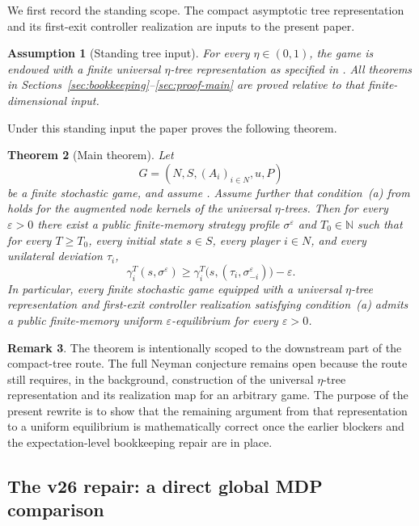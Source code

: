 \documentclass[12pt]{article}
\newtheorem{theorem}{Theorem}[section]
\newtheorem{assumption}[theorem]{Assumption}
\theoremstyle{definition}
\newtheorem{remark}[theorem]{Remark}
\newcommand{\eps}{\varepsilon}
\newcommand{\N}{\mathbb{N}}
\newcommand{\1}{\mathbf{1}}
\begin{document}
We first record the standing scope. The compact asymptotic tree representation and
its first-exit controller realization are inputs to the present paper.

\begin{assumption}[Standing tree input]
\label{ass:tree-input}
For every $\eta\in(0,1)$, the game is endowed with a finite universal
$\eta$-tree representation as specified in
. All theorems in
Sections~\ref{sec:bookkeeping}--\ref{sec:proof-main} are proved relative to that
finite-dimensional input.
\end{assumption}

Under this standing input the paper proves the following theorem.

\begin{theorem}[Main theorem]
\label{thm:main}
Let
\[
G=(N,S,(A_i)_{i\in N},u,P)
\]
be a finite stochastic game, and assume . Assume further
that condition~\textnormal{(a)} from  holds for the augmented node
kernels of the universal $\eta$-trees. Then for every $\eps>0$ there exist a
public finite-memory strategy profile $\sigma^\eps$ and $T_0\in\N$ such that for
every $T\ge T_0$, every initial state $s\in S$, every player $i\in N$, and every
unilateral deviation $\tau_i$,
\[
\gamma_i^T(s,\sigma^\eps)
\ge
\gamma_i^T\bigl(s,(\tau_i,\sigma^\eps_{-i})\bigr)-\eps.
\]
In particular, every finite stochastic game equipped with a universal
$\eta$-tree representation and first-exit controller realization satisfying
condition~\textnormal{(a)} admits a public finite-memory uniform
$\eps$-equilibrium for every $\eps>0$.
\end{theorem}

\begin{remark}
The theorem is intentionally scoped to the downstream part of the compact-tree
route. The full Neyman conjecture remains open because the route still requires,
in the background, construction of the universal $\eta$-tree representation and
its realization map for an arbitrary game. The purpose of the present rewrite is
to show that the remaining argument from that representation to a uniform
equilibrium is mathematically correct once the earlier blockers and the
expectation-level bookkeeping repair are in place.
\end{remark}




\subsection{The v26 repair: a direct global MDP comparison}
\end{document}
